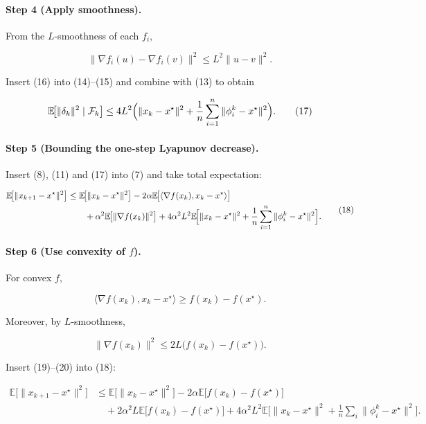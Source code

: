 \documentclass{article}
\newcommand{\E}{\mathbb{E}}
\begin{document}
\paragraph{Step 4 (Apply smoothness).}
From the \(L\)-smoothness of each \(f_i\),

\[
\|\nabla f_i(u)-\nabla f_i(v)\|^{2}\le L^{2}\|u-v\|^{2}.
\tag{16}
\]

Insert (16) into (14)–(15) and combine with (13) to obtain

\[
\E\!\bigl[\|\delta_k\|^{2}\mid\mathcal{F}_k\bigr]
\le 4L^{2}\Bigl(\|x_k-x^{\star}\|^{2}
               +\frac{1}{n}\sum_{i=1}^{n}\|\phi_i^{k}-x^{\star}\|^{2}\Bigr).
\tag{17}
\]

\paragraph{Step 5 (Bounding the one‑step Lyapunov decrease).}
Insert (8), (11) and (17) into (7) and take total expectation:

\[
\begin{aligned}
\E\!\bigl[\|x_{k+1}-x^{\star}\|^{2}\bigr]
&\le \E\!\bigl[\|x_k-x^{\star}\|^{2}\bigr]
   -2\alpha\E\!\bigl[\langle\nabla f(x_k),x_k-x^{\star}\rangle\bigr]   \\
&\qquad +\alpha^{2}\E\!\bigl[\|\nabla f(x_k)\|^{2}\bigr]
   +4\alpha^{2}L^{2}\E\!\Bigl[\|x_k-x^{\star}\|^{2}
          +\frac{1}{n}\sum_{i=1}^{n}\|\phi_i^{k}-x^{\star}\|^{2}\Bigr].
\end{aligned}
\tag{18}
\]

\paragraph{Step 6 (Use convexity of \(f\)).}
For convex \(f\),

\[
\langle\nabla f(x_k),x_k-x^{\star}\rangle\ge f(x_k)-f(x^{\star}).
\tag{19}
\]

Moreover, by \(L\)-smoothness,

\[
\|\nabla f(x_k)\|^{2}\le 2L\bigl(f(x_k)-f(x^{\star})\bigr).
\tag{20}
\]

Insert (19)–(20) into (18):

\[
\begin{aligned}
\E\!\bigl[\|x_{k+1}-x^{\star}\|^{2}\bigr]
&\le \E\!\bigl[\|x_k-x^{\star}\|^{2}\bigr]
   -2\alpha\E\!\bigl[f(x_k)-f(x^{\star})\bigr]   \\
&\quad +2\alpha^{2}L\E\!\bigl[f(x_k)-f(x^{\star})\bigr]
   +4\alpha^{2}L^{2}\E\!\bigl[\|x_k-x^{\star}\|^{2}
          +\tfrac{1}{n}\sum_{i}\|\phi_i^{k}-x^{\star}\|^{2}\bigr].
\end{aligned}
\tag{21}
\]
\end{document}
